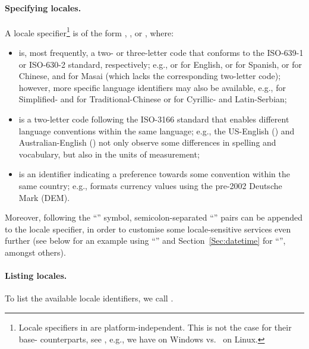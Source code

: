 \documentclass[nojss]{jss}
\newcommand{\strq}[1]{\code{{"{}#1"{}}}}
\begin{document}
\paragraph{Specifying locales.}
A locale specifier\footnote{%
Locale specifiers in  are platform-independent.
This is not the case for their base- counterparts, see
, e.g., we have \strq{Polish\_Poland} on Windows
vs.~\strq{pl\_PL} on Linux.}
is of the form
, , or ,
where:
\begin{itemize}
\item
{} is, most frequently, a two- or three-letter code that conforms to
the ISO-639-1 or ISO-630-2 standard, respectively;
e.g.,  or  for English,  or 
for Spanish,  or  for Chinese, and  for Masai
(which lacks the corresponding two-letter code);
however, more specific language identifiers may also be
available, e.g.,  for Simplified-
and  for Traditional-Chinese
or  for Cyrillic- and  Latin-Serbian;


\item
{} is a two-letter code following the ISO-3166 standard
that enables different language conventions within the same language;
e.g., the US-English () and Australian-English ()
not only observe some differences in spelling and vocabulary, but also
in the units of measurement;

\item
{} is an identifier indicating a preference towards
some convention within the same country; e.g., 
formats currency values using the pre-2002 Deutsche Mark (DEM).
\end{itemize}
Moreover,  following the
``'' symbol, semicolon-separated ``'' pairs
can be appended to the locale specifier, in order to
customise some locale-sensitive services even further
(see below for an example using ``''
and Section~\ref{Sec:datetime} for ``'', amongst others).


{\color{red}

}
%
%





\paragraph{Listing locales.}
To list the available locale identifiers, we call .
\end{document}
